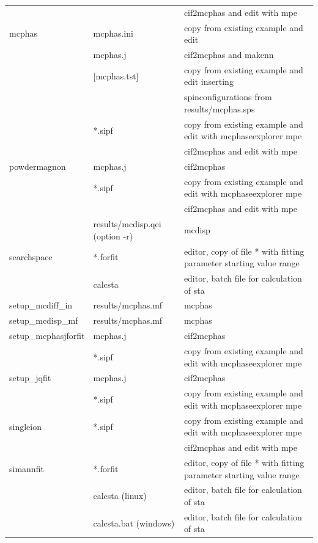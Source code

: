 \begin{table}
\begin{tabular}{lll}
		&			&	cif2mcphas and edit with mpe \\		
mcphas		&	mcphas.ini	&	copy from existing example and edit \\
		&	mcphas.j	&	cif2mcphas and makenn \\
		&	[mcphas.tst] 	&	copy from existing example and edit inserting \\
		&			&  spinconfigurations from results/mcphas.sps \\
		&	*.sipf		&	copy from existing example and edit with mcphaseexplorer mpe \\
		&			&	cif2mcphas and edit with mpe \\	
powdermagnon & mcphas.j	&	cif2mcphas \\
		&	*.sipf		&	copy from existing example and edit with mcphaseexplorer mpe \\
		&			&	cif2mcphas and edit with mpe \\		
		&   results/mcdisp.qei (option -r) & mcdisp \\	
searchspace	&	*.forfit	&	editor, copy of file * with fitting parameter starting value range\\
		&	calcsta	&	editor, batch file for calculation of sta \\
setup\_mcdiff\_in & results/mcphas.mf & mcphas \\
setup\_mcdisp\_mf & results/mcphas.mf & mcphas \\
setup\_mcphasjforfit &   mcphas.j	&	cif2mcphas \\
		&	*.sipf		&	copy from existing example and edit with mcphaseexplorer mpe \\
setup\_jqfit &   mcphas.j	&	cif2mcphas \\
		&	*.sipf		&	copy from existing example and edit with mcphaseexplorer mpe \\
singleion	&	*.sipf		&	copy from existing example and edit with mcphaseexplorer mpe \\
		&			&	cif2mcphas and edit with mpe \\		
simannfit	&	*.forfit	&	editor, copy of file * with fitting parameter starting value range\\
		&	calcsta (linux)	&	editor, batch file for calculation of sta \\
		& 	calcsta.bat (windows)	&	editor, batch file for calculation of sta \\
\end{tabular}
\end{table}

